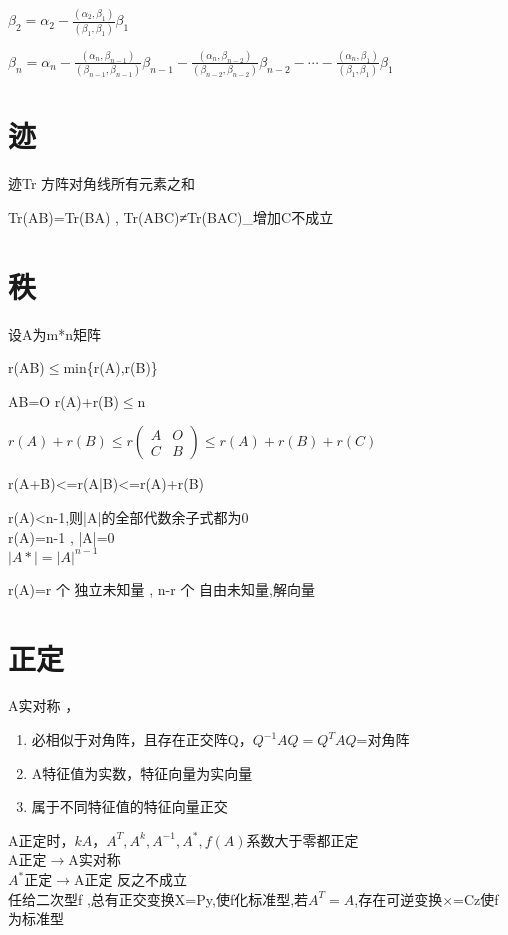 \documentclass[UTF8]{ctexart}
\begin{document}
$\beta_{2}=\alpha_{2}-\frac{(\alpha_{2},\beta_{1})}{(\beta_{1},\beta_{1})}\beta_{1}$

$\beta_{n}=\alpha_{n}-\frac{(\alpha_{n},\beta_{n-1})}{(\beta_{n-1},\beta_{n-1})}\beta_{n-1}-\frac{(\alpha_{n},\beta_{n-2})}{(\beta_{n-2},\beta_{n-2})}\beta_{n-2}-\cdots-\frac{(\alpha_{n},\beta_{1})}{(\beta_{1},\beta_{1})}\beta_{1}$

\section{迹}

迹Tr 方阵对角线所有元素之和

Tr(AB)=Tr(BA) , Tr(ABC)≠Tr(BAC)\_增加C不成立

\section{秩}

设A为m{*}n矩阵

r(AB)$\leq$min\{r(A),r(B)\}

AB=O r(A)+r(B)$\leq$n

$r(A)+r(B)\leq r\begin{pmatrix}A & O\\
C & B
\end{pmatrix}\leq r(A)+r(B)+r(C)$

r(A+B)<=r(A|B)<=r(A)+r(B)

r(A)<n-1,则|A|的全部代数余子式都为0 \\
r(A)=n-1 , |A|=0 \\
$|A*|=|A|^{n-1}$

r(A)=r 个 独立未知量 , n-r 个 自由未知量,解向量

\section{正定}
A实对称 ，
\begin{enumerate}
  \item 必相似于对角阵，且存在正交阵Q，$Q^{-1}AQ=Q^TAQ$=对角阵
  \item A特征值为实数，特征向量为实向量
  \item 属于不同特征值的特征向量正交
\end{enumerate}

  A正定时，$kA，A^T , A^k , A^{-1} , A^* , f(A)\mbox{系数大于零} $都正定 \\

  A正定$\rightarrow$A实对称 \\
 $A^*$正定$\rightarrow$A正定  反之不成立 \\
任给二次型f ,总有正交变换X=Py,使f化标准型,若$A^T=A$,存在可逆变换×=Cz使f为标准型 \\
\end{document}
